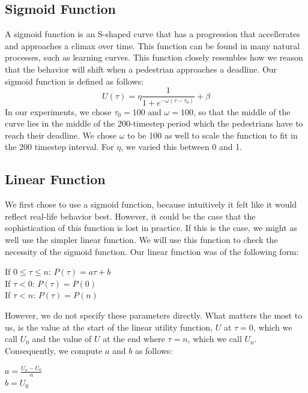 \documentclass[11pt]{book}
\begin{document}
\subsection{Sigmoid Function}
A sigmoid function is an S-shaped curve that has a progression that accellerates and approaches a climax over time. This function can be found in many natural processes, such as learning curves. This function closely resembles how we reason that the behavior will shift when a pedestrian approaches a deadline.
Our sigmoid function is defined as follows:
\begin{equation}
U(\tau) = \eta \frac{1}{1+e^{-\omega(\tau-\tau_0)}} + \beta
\end{equation}
In our experiments, we chose $\tau_0=100$ and $\omega=100$, so that the middle of the curve lies in the middle of the 200-timestep period which the pedestrians have to reach their deadline. We chose $\omega$ to be 100 as well to scale the function to fit in the 200 timestep interval. For $\eta$, we varied this between 0 and 1.


\subsection{Linear Function}
We first chose to use a sigmoid function, because intuitively it felt like it would reflect real-life behavior best. However, it could be the case that the sophistication of this function is lost in practice. If this is the case, we might as well use the simpler linear function. We will use this function to check the necessity of the sigmoid function. Our linear function was of the following form:
\begin{center}
If $0 \leq \tau \leq n$: $P(\tau) = a\tau + b$\\
If $\tau<0$: $P(\tau) = P(0)$\\
If $\tau<n$: $P(\tau) = P(n)$
\end{center}
However, we do not specify these parameters directly. What matters the most to us, is the value at the start of the linear utility function, $U$ at $\tau=0$, which we call $U_0$ and the value of $U$ at the end where $\tau=n$, which we call $U_n$. Consequently, we compute $a$ and $b$ as follows:
\begin{center}
$a = \frac{U_n - U_0}{n}$\\
$b = U_0$
\end{center}
\end{document}
